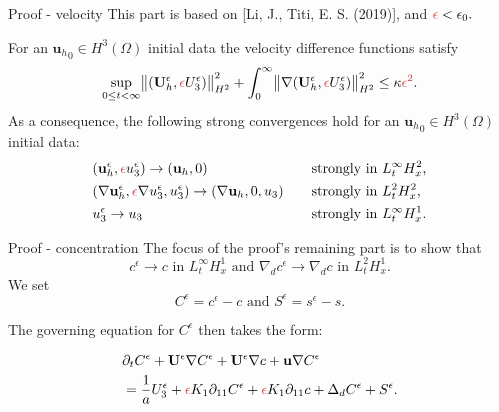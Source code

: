 \documentclass{beamer}
\begin{document}
\begin{frame}{Proof - velocity}
This part is based on [Li, J., Titi, E. S. (2019)], and $\textcolor{jasper}{\epsilon} < \epsilon_0.$

For an ${\mathbf{u}_h}_0 \in H^3(\Omega)$ initial data the velocity difference functions satisfy
%
\begin{equation} \nonumber
\sup_{0 \leq t < \infty}{\norm{(\mathbf{U}_h^\epsilon, \textcolor{jasper}{\epsilon} U_3^\epsilon)}_{H^2}^2} + \int_0^\infty \norm{\nabla (\mathbf{U}_h^\epsilon, \textcolor{jasper}{\epsilon} U_3^\epsilon)}_{H^2}^2 \leq \kappa \textcolor{jasper}{\epsilon^2}.
\end{equation}
%
As a consequence, the following strong convergences hold for an ${\mathbf{u}_h}_0 \in H^3(\Omega)$ initial data:
\begin{align}
&  (\mathbf{u}_h^\epsilon, \textcolor{jasper}{\epsilon} u_3^\epsilon) \to (\mathbf{u}_h, 0) &\quad & \text{strongly in $L_t^\infty H_x^2$,} \nonumber \\
&  (\nabla \mathbf{u}_h^\epsilon, \textcolor{jasper}{\epsilon} \nabla u_3^\epsilon, u_3^\epsilon) \to (\nabla \mathbf{u}_h, 0, u_3) &\quad & \text{strongly in $L_t^2 H_x^2$,} \nonumber \\ 
&  u_3^\epsilon \to u_3 &\quad & \text{strongly in $L_t^\infty H_x^1.$} \nonumber
\end{align}
\end{frame}

\begin{frame}{Proof - concentration}
The focus of the proof's remaining part is to show that
%
\begin{equation}\nonumber
  c^\epsilon \to c \text{ in } L_t^\infty H_x^1 \text{ and } \nabla_d c^\epsilon \to \nabla_d c \text{ in } L_t^2 H_x^1.
\end{equation}
We set $$C^\epsilon = c^\epsilon-c \text{ and } S^\epsilon = s^\epsilon-s.$$

The governing equation for $C^\epsilon$ then takes the form:

\begin{equation} \nonumber
  \begin{split}
   & \partial_t C^\epsilon + \mathbf{U}^\epsilon \nabla C^\epsilon  + \mathbf{U}^\epsilon \nabla c+ \mathbf{u} \nabla C^\epsilon \\
   & = \frac{1}{a} U_3^\epsilon + \textcolor{jasper}{\epsilon} K_1 \partial_{11} C^\epsilon + \textcolor{jasper}{\epsilon} K_1 \partial_{11} c + \Delta_d C^\epsilon + S^\epsilon.
   \end{split}
\end{equation}
\end{frame}
\end{document}
